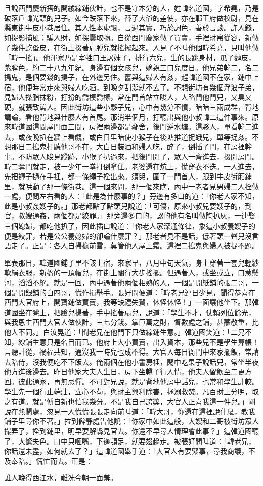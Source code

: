 且說西門慶新搭的開絨線鋪伙計，也不是守本分的人，姓韓名道國，字希堯，乃是破落戶韓光頭的兒子。如今跌落下來，替了大爺的差使，亦在鄆王府做校尉，見在縣東街牛皮小巷居住。其人性本虛飄，言過其實，巧於詞色，善於言談。許人錢，如捉影捕風；騙人財，如探囊取物。自從西門慶家做了買賣，手裡財帛從容，新做了幾件虼蚤皮，在街上掇著肩膊兒就搖擺起來。人見了不叫他個韓希堯，只叫他做「韓一搖」。他渾家乃是宰牲口王屠妹子，排行六兒，生的長跳身材，瓜子麵皮，紫膛色，約二十八九年紀。身邊有個女孩兒，嫡親三口兒度日。他兄弟韓二，名二搗鬼，是個耍錢的搗子，在外邊另住。舊與這婦人有姦，趕韓道國不在家，鋪中上宿，他便時常走來與婦人吃酒，到晚夕刮涎就不去了。不想街坊有幾個浮浪子弟，見婦人搽脂抹粉，打扮的喬模喬樣，常在門首站立睃人，人略鬥他鬥兒，又臭又硬，就張致罵人。因此街坊這些小夥子兒，心中有幾分不憤，暗暗三兩成群，背地講論，看他背地與什麼人有首尾。那消半個月，打聽出與他小叔韓二這件事來。原來韓道國這間屋門面三間，房裡兩邊都是鄰舍，後門逆水塘。這夥人，單看韓二進去，或夜晚扒在牆上看覷，或白日里暗使小猴子在後塘推道捉蛾兒，單等捉姦。不想那日二搗鬼打聽他哥不在，大白日裝酒和婦人吃，醉了，倒插了門，在房裡幹事。不防眾人睃見蹤跡，小猴子扒過來，把後門開了，眾人一齊進去，掇開房門。韓二奪門就走，被一少年一拳打倒拿住。老婆還在炕上，慌穿衣不迭。一人進去，先把褲子撾在手裡，都一條繩子拴出來。須臾，圍了一門首人，跟到牛皮街廂鋪里，就哄動了那一條街巷。這一個來問，那一個來瞧，內中一老者見男婦二人拴做一處，便問左右看的人：「此是為什麼事的？」旁邊有多口的道：「你老人家不知，此是小叔姦嫂子的。」那老都點了點頭兒說道：「可傷，原來小叔兒要嫂子的，到官，叔嫂通姦，兩個都是絞罪。」那旁邊多口的，認的他有名叫做陶扒灰，一連娶三個媳婦，都吃他扒了，因此插口說道：「你老人家深通條律，象這小叔養嫂子的便是絞罪，若是公公養媳婦的卻論什麼罪？」那老者見不是話，低著頭一聲兒沒言語走了。正是：各人自掃檐前雪，莫管他人屋上霜。這裡二搗鬼與婦人被捉不題。

單表那日，韓道國鋪子里不該上宿，來家早，八月中旬天氣，身上穿著一套兒輕紗軟絹衣服，新盔的一頂帽兒，在街上闊行大步搖擺。但遇著人，或坐或立，口惹懸河，滔滔不絕。就是一回，內中遇著他兩個相熟的人，一個是開紙鋪的張二哥，一個是開銀鋪的白四哥，慌作揖舉手。張好問便道：「韓老兄連日少見，聞得恭喜在西門大官府上，開寶鋪做買賣，我等缺禮失賀，休怪休怪！」一面讓他坐下。那韓道國坐在凳上，把臉兒揚著，手中搖著扇兒，說道：「學生不才，仗賴列位餘光，與我恩主西門大官人做伙計，三七分錢。掌巨萬之財，督數處之鋪，甚蒙敬重，比他人不同。」白汝晃道：「聞老兄在他門下只做線鋪生意。」韓道國笑道：「二兄不知，線鋪生意只是名目而已。他府上大小買賣，出入資本，那些兒不是學生算帳！言聽計從，禍福共知，通沒我一時兒也成不得。大官人每日衙門中來家擺飯，常請去陪侍，沒我便吃不下飯去。俺兩個在他小書房裡，閑中吃果子說話兒，常坐半夜他方進後邊去。昨日他家大夫人生日，房下坐轎子行人情，他夫人留飲至二更方回。彼此通家，再無忌憚。不可對兄說，就是背地他房中話兒，也常和學生計較。學生先一個行止端莊，立心不苟，與財主興利除害，拯溺救焚。凡百財上分明，取之有道。就是傅自新也怕我幾分。不是我自己誇獎，大官人正喜我這一件兒。」剛說在熱鬧處，忽見一人慌慌張張走向前叫道：「韓大哥，你還在這裡說什麼，教我鋪子里尋你不著。」拉到僻靜處告他說：「你家中如此這般，大嫂和二哥被街坊眾人撮弄了，拴到鋪里，明早要解縣見官去。你還不早尋人情理會此事？」這韓道國聽了，大驚失色。口中只咂嘴，下邊頓足，就要翅趫走。被張好問叫道：「韓老兄，你話還未盡，如何就去了？」這韓道國舉手道：「大官人有要緊事，尋我商議，不及奉陪。」慌忙而去。正是：

誰人輓得西江水，難洗今朝一面羞。


